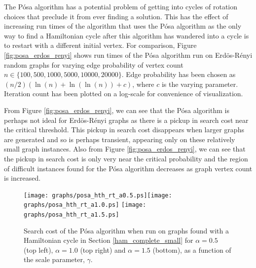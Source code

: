 \documentclass[twoside,11pt]{article}
\begin{document}
The P\'osa algorithm has a potential problem of getting into cycles of rotation choices that preclude it from ever finding a solution.
This has the effect of increasing run times of the algorithm that uses the {P\'osa} algorithm as the only way to find a Hamiltonian
cycle after this algorithm has wandered into a cycle is to restart with a different initial vertex.  For comparison,
Figure \ref{fig:posa_erdos_renyi}
shows run times of
the P\'osa algorithm run on Erd\"os-R\'enyi random graphs
for varying edge probability
of vertex count $n \in \{100, 500, 1000, 5000, 10000, 20000\}$.
Edge probability has been chosen as $ (n/2) (\ln(n) + \ln(\ln(n)) + c)$, where $c$ is the varying parameter.
Iteration count has been plotted on a log-scale for convenience of visualization.

From Figure \ref{fig:posa_erdos_renyi}, we can see that the P\'osa algorithm is
perhaps not ideal for Erd\"os-R\'enyi graphs as there is a pickup in search cost near the critical threshold.  This pickup in search
cost disappears when larger graphs are generated and so is perhaps transient, appearing only on these relatively small graph instances.
Also from Figure \ref{fig:posa_erdos_renyi}, we can see that the pickup in search cost is only very near the critical probability
and the region of difficult instances found for the P\'osa algorithm decreases as graph vertex count is increased.


\begin{figure}
\centering
\texttt{[image: graphs/posa\_hth\_rt\_a0.5.ps]}\texttt{[image: graphs/posa\_hth\_rt\_a1.0.ps]}
\texttt{[image: graphs/posa\_hth\_rt\_a1.5.ps]}

\caption{Search cost of the P\'osa algorithm when run on graphs found with a Hamiltonian cycle in Section \ref{ham_complete_small}
for $\alpha = 0.5$ (top left),  $\alpha = 1.0$ (top right) and $\alpha = 1.5$ (bottom),
as a function of the scale parameter, $\gamma$. }
\label{fig:posa_hth_rt_a0.5}
\label{fig:posa_hth_rt_a1.0}
\label{fig:posa_hth_rt_a1.5}
\end{figure}


\end{document}
